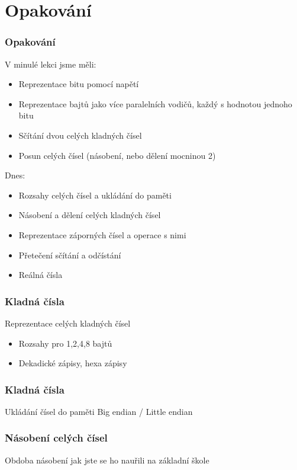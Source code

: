 \documentclass{beamer}
\subtitle{Lekce 02. Reprezentace čísel}
\author{Petr Štěpán\\ \small\texttt{stepan@fel.cvut.cz}}
\begin{document}
\maketitle

\section{Opakování}


\begin{frame}
\frametitle{Opakování}
V minulé lekci jsme měli:
\begin{itemize}
\item Reprezentace bitu pomocí napětí
\item Reprezentace bajtů jako více paralelních vodičů, každý s hodnotou jednoho bitu
\item Sčítání dvou celých kladných čísel
\item Posun celých čísel (násobení, nebo dělení mocninou 2)
\end{itemize}

Dnes:
\begin{itemize}
\item Rozsahy celých čísel a ukládání do paměti
\item Násobení a dělení celých kladných čísel 
\item Reprezentace záporných čísel a operace s nimi
\item Přetečení sčítání a odčístání
\item Reálná čísla
\end{itemize}

\end{frame}


\begin{frame}
\frametitle{Kladná čísla}
Reprezentace celých kladných čísel
\begin{itemize}
\item Rozsahy pro 1,2,4,8 bajtů
\item Dekadické zápisy, hexa zápisy
\end{itemize}

\end{frame}


\begin{frame}
\frametitle{Kladná čísla}

Ukládání čísel do paměti Big endian / Little endian
\end{frame}



\begin{frame}
\frametitle{Násobení celých čísel}

Obdoba násobení jak jste se ho nauřili na základní škole
\end{frame}
\end{document}
